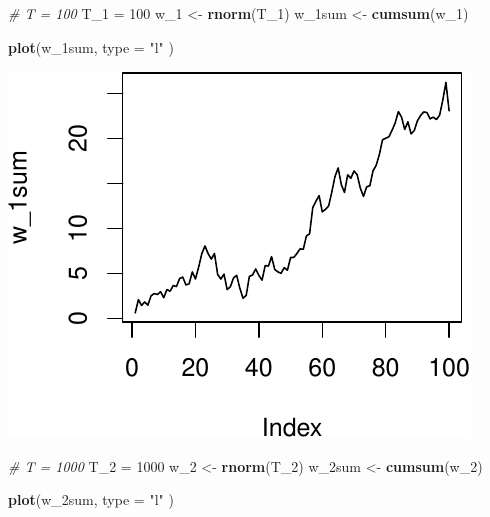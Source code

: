 \documentclass[11pt,]{article}
\newenvironment{Shaded}{\begin{snugshade}}{\end{snugshade}}
\newcommand{\KeywordTok}[1]{\textcolor[rgb]{0.13,0.29,0.53}{\textbf{#1}}}
\newcommand{\DataTypeTok}[1]{\textcolor[rgb]{0.13,0.29,0.53}{#1}}
\newcommand{\DecValTok}[1]{\textcolor[rgb]{0.00,0.00,0.81}{#1}}
\newcommand{\StringTok}[1]{\textcolor[rgb]{0.31,0.60,0.02}{#1}}
\newcommand{\CommentTok}[1]{\textcolor[rgb]{0.56,0.35,0.01}{\textit{#1}}}
\newcommand{\NormalTok}[1]{#1}
\begin{document}
\begin{Shaded}
\begin{Highlighting}[]
\CommentTok{# T = 100}
\NormalTok{T_}\DecValTok{1}\NormalTok{ =}\StringTok{ }\DecValTok{100}
\NormalTok{w_}\DecValTok{1}\NormalTok{ <-}\StringTok{ }\KeywordTok{rnorm}\NormalTok{(T_}\DecValTok{1}\NormalTok{)}
\NormalTok{w_1sum <-}\StringTok{ }\KeywordTok{cumsum}\NormalTok{(w_}\DecValTok{1}\NormalTok{)}

\KeywordTok{plot}\NormalTok{(w_1sum,}
     \DataTypeTok{type =} \StringTok{"l"}
\NormalTok{     )}
\end{Highlighting}
\end{Shaded}

\begin{center}\includegraphics{FMC_T4_PhD_Wiener_Process_files/figure-latex/wiener_process_mean_var-1} \end{center}

\begin{Shaded}
\begin{Highlighting}[]
\CommentTok{# T = 1000}
\NormalTok{T_}\DecValTok{2}\NormalTok{ =}\StringTok{ }\DecValTok{1000}
\NormalTok{w_}\DecValTok{2}\NormalTok{ <-}\StringTok{ }\KeywordTok{rnorm}\NormalTok{(T_}\DecValTok{2}\NormalTok{)}
\NormalTok{w_2sum <-}\StringTok{ }\KeywordTok{cumsum}\NormalTok{(w_}\DecValTok{2}\NormalTok{)}

\KeywordTok{plot}\NormalTok{(w_2sum,}
     \DataTypeTok{type =} \StringTok{"l"}
\NormalTok{     )}
\end{Highlighting}
\end{Shaded}
\end{document}
